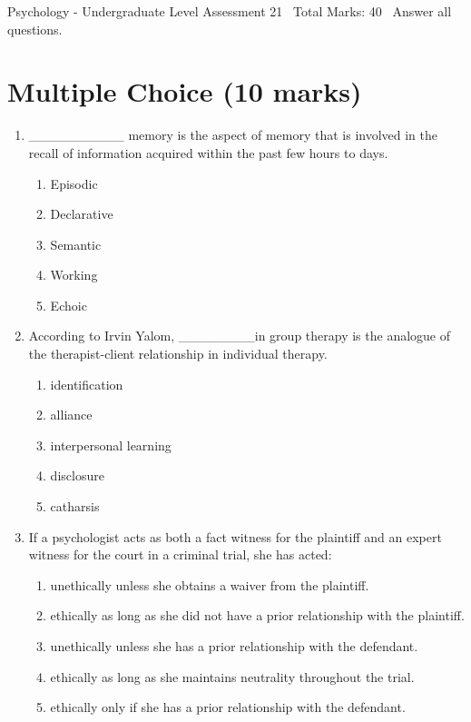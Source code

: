 \documentclass[12pt]{article}
\begin{document}
\begin{center}
Psychology - Undergraduate Level Assessment 21 \
Total Marks: 40 \
Answer all questions.
\end{center}

\section*{Multiple Choice (10 marks)}
\begin{enumerate}[label=\arabic*.]
\item \_\_\_\_\_\_\_\_\_\_ memory is the aspect of memory that is involved in the recall of information acquired within the past few hours to days.
\begin{enumerate}[label=(\alph*)]
    \item Episodic
    \item Declarative
    \item Semantic
    \item Working
    \item Echoic
\end{enumerate}
\item According to Irvin Yalom, \_\_\_\_\_\_\_\_in group therapy is the analogue of the therapist-client relationship in individual therapy.
\begin{enumerate}[label=(\alph*)]
    \item identification
    \item alliance
    \item interpersonal learning
    \item disclosure
    \item catharsis
\end{enumerate}
\item If a psychologist acts as both a fact witness for the plaintiff and an expert witness for the court in a criminal trial, she has acted:
\begin{enumerate}[label=(\alph*)]
    \item unethically unless she obtains a waiver from the plaintiff.
    \item ethically as long as she did not have a prior relationship with the plaintiff.
    \item unethically unless she has a prior relationship with the defendant.
    \item ethically as long as she maintains neutrality throughout the trial.
    \item ethically only if she has a prior relationship with the defendant.

\end{enumerate}
\end{enumerate}
\end{document}
